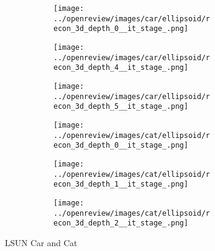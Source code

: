 \begin{figure}[h]
\begin{subfigure}{0.80\textwidth}
    \begin{subfigure}{0.16\textwidth}
        \centering
        \texttt{[image: ../openreview/images/car/ellipsoid/recon\_3d\_depth\_0\_\_it\_stage\_.png]}
        \caption{}
    \end{subfigure}
    \begin{subfigure}{0.16\textwidth}
        \centering
        \texttt{[image: ../openreview/images/car/ellipsoid/recon\_3d\_depth\_4\_\_it\_stage\_.png]}
        \caption{}
    \end{subfigure}
    \begin{subfigure}{0.16\textwidth}
        \centering
        \texttt{[image: ../openreview/images/car/ellipsoid/recon\_3d\_depth\_5\_\_it\_stage\_.png]}
        \caption{}
    \end{subfigure}
    \begin{subfigure}{0.16\textwidth}
        \centering
        \texttt{[image: ../openreview/images/cat/ellipsoid/recon\_3d\_depth\_0\_\_it\_stage\_.png]}
        \caption{}
    \end{subfigure}
    \begin{subfigure}{0.16\textwidth}
        \centering
        \texttt{[image: ../openreview/images/cat/ellipsoid/recon\_3d\_depth\_1\_\_it\_stage\_.png]}
        \caption{}
    \end{subfigure}
    \begin{subfigure}{0.16\textwidth}
        \centering
        \texttt{[image: ../openreview/images/cat/ellipsoid/recon\_3d\_depth\_2\_\_it\_stage\_.png]}
        \caption{}
    \end{subfigure}
    
    \end{subfigure}
    \caption{LSUN Car and Cat}
    \label{fig:result-car-cat}
\end{figure}
